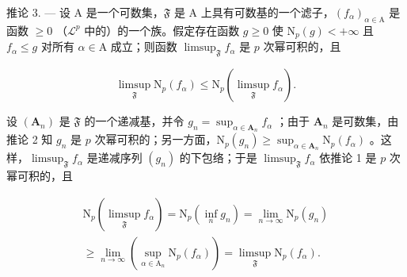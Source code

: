 推论 3. --- 设 A 是一个可数集，\(\mathfrak{F}\) 是 A 上具有可数基的一个滤子，\((f_{\alpha})_{\alpha \in \mathrm{A}}\) 是函数 \(\geqslant 0\) （\(\mathcal{L}^p\) 中的）的一个族。假定存在函数 \(g \geqslant 0\) 使 \(\mathrm{N}_p(g) < +\infty\) 且 \(f_{\alpha} \leqslant g\) 对所有 \(\alpha \in \mathrm{A}\) 成立；则函数 \(\limsup_{\mathfrak{F}} f_{\alpha}\) 是 \(p\) 次幂可积的，且

\[
\limsup _ {\mathfrak {F}} \mathrm{N} _ {p} (f _ {\alpha}) \leqslant \mathrm{N} _ {p} (\limsup _ {\mathfrak {F}} f _ {\alpha}).\tag{12}
\]

设 \((\mathbf{A}_n)\) 是 \(\mathfrak{F}\) 的一个递减基，并令 \(g_{n} = \sup_{\alpha \in \mathbf{A}_{n}}f_{\alpha}\) ；由于 \(\mathbf{A}_n\) 是可数集，由推论 2 知 \(g_{n}\) 是 \(p\) 次幂可积的；另一方面，\(\mathrm{N}_p(g_n)\geqslant \sup_{\alpha \in \mathbf{A}_n}\mathrm{N}_p(f_\alpha)\) 。这样，\(\limsup_{\mathfrak{F}}f_{\alpha}\) 是递减序列 \((g_n)\) 的下包络；于是 \(\limsup_{\mathfrak{F}}f_{\alpha}\) 依推论 1 是 \(p\) 次幂可积的，且

\[
\begin{array}{l} \mathrm{N} _ {p} (\limsup _ {\mathfrak {F}} f _ {\alpha}) = \mathrm{N} _ {p} \left(\inf _ {n} g _ {n}\right) = \lim _ {n \to \infty} \mathrm{N} _ {p} (g _ {n}) \\ \geqslant \lim _ {n \to \infty} \left(\sup _ {\alpha \in \mathrm{A} _ {n}} \mathrm{N} _ {p} (f _ {\alpha})\right) = \limsup _ {\mathfrak {F}} \mathrm{N} _ {p} (f _ {\alpha}). \end{array}
\]

